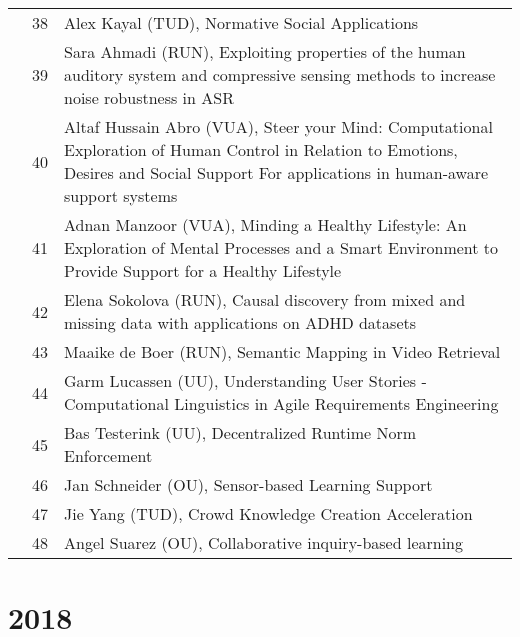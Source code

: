 {\begin{xltabular}{\linewidth}{@{} l @{\hspace{0.5em}} l @{\hspace{1em}} X @{}}
        &	 38	&	 Alex Kayal (TUD), Normative Social Applications \\
        &	 39	&	 Sara Ahmadi (RUN), Exploiting properties of the human auditory system and compressive sensing methods to increase   noise robustness in ASR \\
        &	 40	&	 Altaf Hussain Abro (VUA), Steer your Mind: Computational Exploration of Human Control in Relation to Emotions, Desires and Social Support For applications in human-aware support systems \\
        &	 41	&	 Adnan Manzoor (VUA), Minding a Healthy Lifestyle: An Exploration of Mental Processes and a Smart Environment to Provide Support for a Healthy Lifestyle\\
        &	 42	&	 Elena Sokolova (RUN), Causal discovery from mixed and missing data with applications on ADHD  datasets\\
        &	 43	&	 Maaike de Boer (RUN), Semantic Mapping in Video Retrieval\\
        &	 44	&	 Garm Lucassen (UU), Understanding User Stories - Computational Linguistics in Agile Requirements Engineering\\
        &	 45	&	 Bas Testerink	(UU), Decentralized Runtime Norm Enforcement\\
        &	 46	&	 Jan Schneider	(OU), Sensor-based Learning Support\\
        &	 47	&	 Jie Yang (TUD), Crowd Knowledge Creation Acceleration\\
        &	 48	&	 Angel Suarez (OU), Collaborative inquiry-based learning\\

\end{xltabular}


\section*{2018}
\begin{xltabular}{\linewidth}{@{} l @{\hspace{0.5em}} l @{\hspace{1em}} X @{}}


\end{xltabular}}
